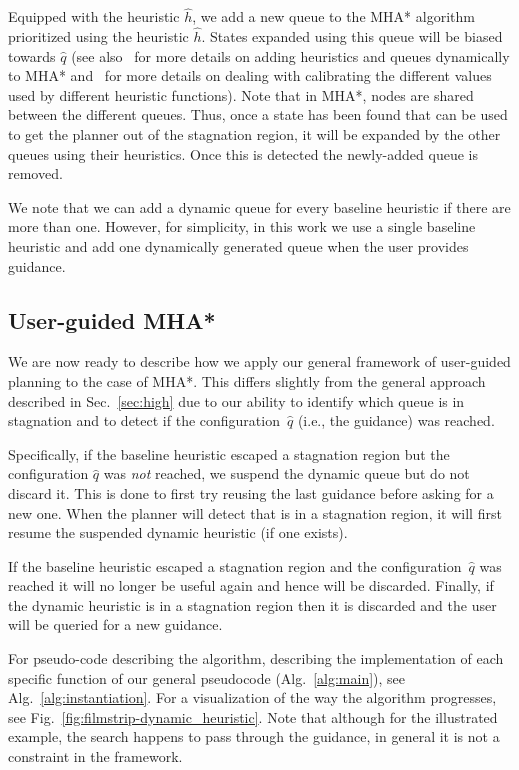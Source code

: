 \documentclass{article}
\begin{document}
Equipped with the heuristic $\hat{h}$, we add a new queue to the MHA* algorithm prioritized using the heuristic $\hat{h}$. %
States expanded using this queue will be biased towards $\hat{q}$ (see also~\cite{INL15} for more details on adding heuristics and queues dynamically to MHA*
and~\cite{NAL15} for more details on dealing with calibrating the different values used by different heuristic functions).
Note that in MHA*, nodes are shared between the different queues.
Thus, once a state has been found that can be used to get the planner out of the stagnation region, it will be expanded by the other queues using their heuristics.
Once this is detected 
the newly-added queue is removed.

We note that we can add a dynamic queue for every baseline heuristic if there are more than one. However, for simplicity, in this work we use a single baseline heuristic and add one dynamically generated queue when the user provides guidance.

\subsection{User-guided MHA*}
\label{sec:instantiation}
We are now ready to describe how we apply our general framework of user-guided planning to the case of MHA*.
This differs slightly from the general approach described in Sec.~\ref{sec:high} due to our ability to identify which queue is in stagnation and to detect if the configuration~$\hat{q}$ (i.e., the guidance) was reached.

Specifically, if the baseline heuristic escaped a stagnation region but the configuration $\hat{q}$ was \emph{not} reached, we suspend the dynamic queue but do not discard it. 
This is done to first try reusing the last guidance before asking for a new one. 
When the planner will detect that is in a stagnation region, it will first resume the suspended dynamic heuristic (if one exists).

If the baseline heuristic escaped a stagnation region and the configuration~$\hat{q}$ was  reached it will no longer be useful again and hence will be discarded.
Finally, if the dynamic heuristic is in a stagnation region then it is discarded and the user will be queried for a new guidance. 

For pseudo-code describing the algorithm, describing the implementation of each specific function of our general pseudocode (Alg.~\ref{alg:main}), see Alg.~\ref{alg:instantiation}.
For a visualization of the way the algorithm progresses, see Fig.~\ref{fig:filmstrip-dynamic_heuristic}. Note that although for the illustrated example, the search happens to pass through the guidance, in general it is not a constraint in the framework. 
%
\end{document}
